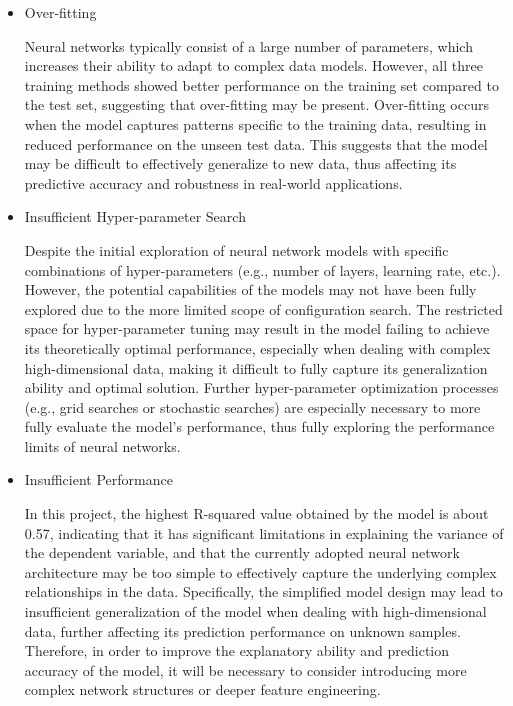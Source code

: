 \documentclass[conference]{IEEEtran}
\begin{document}
\begin{itemize}
\item Over-fitting

Neural networks typically consist of a large number of parameters, which increases their ability to adapt to complex data models. However, all three training methods showed better performance on the training set compared to the test set, suggesting that over-fitting may be present. Over-fitting occurs when the model captures patterns specific to the training data, resulting in reduced performance on the unseen test data. This suggests that the model may be difficult to effectively generalize to new data, thus affecting its predictive accuracy and robustness in real-world applications.

\item Insufficient Hyper-parameter Search

Despite the initial exploration of neural network models with specific combinations of hyper-parameters (e.g., number of layers, learning rate, etc.). However, the potential capabilities of the models may not have been fully explored due to the more limited scope of configuration search. The restricted space for hyper-parameter tuning may result in the model failing to achieve its theoretically optimal performance, especially when dealing with complex high-dimensional data, making it difficult to fully capture its generalization ability and optimal solution. Further hyper-parameter optimization processes (e.g., grid searches or stochastic searches) are especially necessary to more fully evaluate the model's performance, thus fully exploring the performance limits of neural networks.

\item Insufficient Performance

In this project, the highest R-squared value obtained by the model is about 0.57, indicating that it has significant limitations in explaining the variance of the dependent variable, and that the currently adopted neural network architecture may be too simple to effectively capture the underlying complex relationships in the data. Specifically, the simplified model design may lead to insufficient generalization of the model when dealing with high-dimensional data, further affecting its prediction performance on unknown samples. Therefore, in order to improve the explanatory ability and prediction accuracy of the model, it will be necessary to consider introducing more complex network structures or deeper feature engineering.

\end{itemize}
\end{document}

